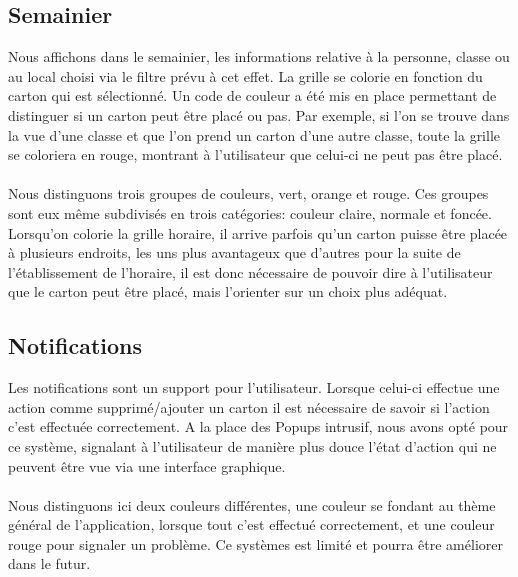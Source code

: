 \subsection{Semainier}
Nous affichons dans le semainier, les informations relative à la personne, classe ou au local choisi via le filtre prévu à cet effet. La grille se colorie en fonction du carton qui est sélectionné. Un code de couleur a été mis en place permettant de distinguer si un carton peut être placé ou pas. Par exemple, si l'on se trouve dans la vue d'une classe et que l'on prend un carton d'une autre classe, toute la grille se coloriera en rouge, montrant à l'utilisateur que celui-ci ne peut pas être placé.\\
\\
Nous distinguons trois groupes de couleurs, vert, orange et rouge. Ces groupes sont eux même subdivisés en trois catégories: couleur claire, normale et foncée. Lorsqu'on colorie la grille horaire, il arrive parfois qu'un carton puisse être placée à plusieurs endroits, les uns plus avantageux que d'autres pour la suite de l'établissement de l'horaire, il est donc nécessaire de pouvoir dire à l'utilisateur que le carton peut être placé, mais l'orienter sur un choix plus adéquat.
\subsection{Notifications}
Les notifications sont un support pour l'utilisateur. Lorsque celui-ci effectue une action comme supprimé/ajouter un carton il est nécessaire de savoir si l'action c'est effectuée correctement. A la place des Popups intrusif, nous avons opté pour ce système, signalant à l'utilisateur de manière plus douce l'état d'action qui ne peuvent être vue via une interface graphique.\\
\\
Nous distinguons ici deux couleurs différentes, une couleur se fondant au thème général de l'application, lorsque tout c'est effectué correctement, et une couleur rouge pour signaler un problème. Ce systèmes est limité et pourra être améliorer dans le futur.
